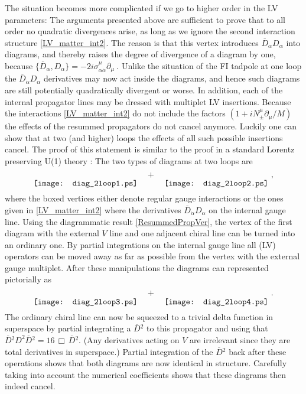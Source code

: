 \documentclass[12pt]{revtex4}
\begin{document}
The situation becomes more complicated if we go to higher order in 
the LV parameters: The arguments presented above are sufficient to
prove that to all order no quadratic divergences arise, as long as we
ignore the second interaction structure \eqref{LV_matter_int2}. The
reason is that this vertex introduces $\overline{D}_{\dot\alpha}
D_\alpha$ into diagrams, and thereby raises 
the degree of divergence of a diagram by one, because 
\(
\{\overline{D}_{\dot\alpha}, D_\alpha\} = 
-2 i \sigma_{\alpha\dot\alpha}^\mu \partial_\mu~.
\) 
Unlike the situation of the FI tadpole at one loop the
$\overline{D}_{\dot\alpha} D_\alpha$ derivatives may now act inside
the diagrams, and hence such diagrams 
are still potentially quadratically divergent or worse. In addition, 
each of the internal propagator lines may be dressed with multiplet LV
insertions. Because the interactions \eqref{LV_matter_int2} do
not include the factors $(1+i N_\pm^\mu \partial_\mu/M)$ the effects
of the resummed propagators do not cancel anymore. Luckily one 
can show that at two (and higher) loops the effects of all such
possible insertions cancel. The proof of this statement is similar to
the proof in a standard Lorentz preserving U(1) theory
\cite{Fischler:1981zk}: The two types of diagrams at two loops are 
\begin{equation}
\raisebox{-2.5ex}{\texttt{[image: diag\_2loop1.ps]}}
\quad + \quad 
\raisebox{-2.5ex}{\texttt{[image: diag\_2loop2.ps]}}
~,
\end{equation} 
where the boxed vertices either denote regular gauge interactions or
the ones given in \eqref{LV_matter_int2} where the derivatives
$\overline{D}_{\dot\alpha} D_\alpha$ on the internal gauge line. 
Using the diagrammatic result \eqref{ResummedPropVer}, the vertex of 
the first diagram with the external $V$ line and one adjacent chiral
line can be turned into an ordinary one. By partial integrations on
the internal gauge line all (LV) operators can be moved away as far as
possible from the vertex with the external gauge multiplet. After
these manipulations the diagrams can represented pictorially as  
\begin{equation}
\raisebox{-2.5ex}{\texttt{[image: diag\_2loop3.ps]}}
\quad + \quad 
\raisebox{-2.5ex}{\texttt{[image: diag\_2loop4.ps]}}
~.
\end{equation} 
The ordinary chiral line can now be squeezed to a trivial delta
function in superspace by partial integrating a $\overline{D}{}^2$ to
this propagator and using that 
$\overline{D}{}^2 D^2 \overline{D}{}^2 = 16\, \Box\, \overline{D}{}^2$. 
(Any derivatives acting on $V$ are irrelevant since they are total
derivatives in superspace.) Partial integration of the
$\overline{D}{}^2$ back after these operations shows that both diagrams
are now identical in structure. Carefully taking into account the
numerical coefficients shows that these diagrams then indeed cancel. 
\end{document}
